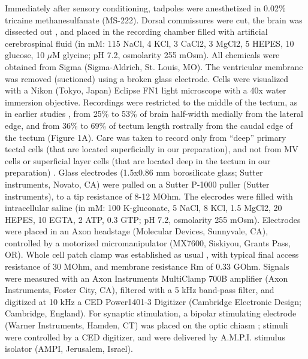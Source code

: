 \documentclass{article}
\begin{document}
Immediately after sensory conditioning, tadpoles were anesthetized in 0.02\% tricaine methanesulfanate (MS-222). Dorsal commissures were cut, the brain was dissected out \citep{aizenman2003,ciarleglio2015}, and placed in the recording chamber filled with artificial cerebrospinal fluid (in mM: 115 NaCl, 4 KCl, 3 CaCl2, 3 MgCl2, 5 HEPES, 10 glucose, 10 $\mu$M glycine; pH 7.2, osmolarity 255 mOsm). All chemicals were obtained from Sigma (Sigma-Aldrich, St. Louis, MO). The ventricular membrane was removed (suctioned) using a broken glass electrode. Cells were visualized with a Nikon (Tokyo, Japan) Eclipse FN1 light microscope with a 40x water immersion objective. Recordings were restricted to the middle of the tectum, as in earlier studies \citep{ciarleglio2015}, from 25\% to 53\% of brain half-width medially from the lateral edge, and from 36\% to 69\% of tectum length rostrally from the caudal edge of the tectum (Figure 1A). Care was taken to record only from “deep” primary tectal cells (that are located superficially in our preparation), and not from MV cells \citep{pratt2009} or superficial layer cells (that are located deep in the tectum in our preparation) \citep{liu2016}. Glass electrodes (1.5x0.86 mm borosilicate glass; Sutter instruments, Novato, CA) were pulled on a Sutter P-1000 puller (Sutter instruments), to a tip resistance of 8-12 MOhm. The elecrodes were filled with intracellular saline (in mM: 100 K-gluconate, 5 NaCl, 8 KCl, 1.5 MgCl2, 20 HEPES, 10 EGTA, 2 ATP, 0.3 GTP; pH 7.2, osmolarity 255 mOsm). Electrodes were placed in an Axon headstage (Molecular Devices, Sunnyvale, CA), controlled by a motorized micromanipulator (MX7600, Siskiyou, Grants Pass, OR). Whole cell patch clamp was established as usual \citep{ciarleglio2015}, with typical final access resistance of 30 MOhm, and membrane resistance Rm of 0.33 GOhm. Signals were measured with an Axon Instruments MultiClamp 700B amplifier (Axon Instruments, Foster City, CA), filtered with a 5 kHz band-pass filter, and digitized at 10 kHz a CED Power1401-3 Digitizer (Cambridge Electronic Design; Cambridge, England). For synaptic stimulation, a bipolar stimulating electrode (Warner Instruments, Hamden, CT) was placed on the optic chiasm \citep{wu1996}; stimuli were controlled by a CED digitizer, and were delivered by A.M.P.I. stimulus isolator (AMPI, Jerusalem, Israel).
\end{document}

